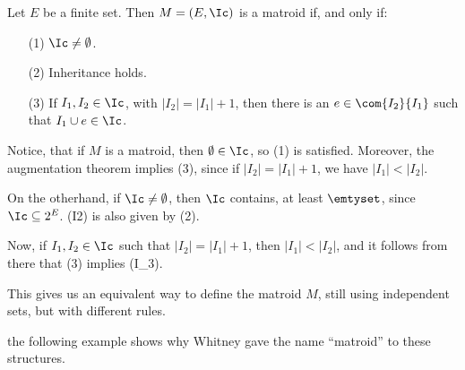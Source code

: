 \begin{example}
    Let $E$ be a finite set. Then $M=(E,\Ic)$ is a matroid if, and only if:
    \begin{enumerate}
        \item[(1)] $\Ic \neq \emptyset$.

        \item[(2)] Inheritance holds.

        \item[(3)] If $I_1,I_2 \in \Ic$, with $|I_2|=|I_1|+1$, then there is an
            $e \in \com{I_2}{I_1}$ such that $I_1 \cup e \in \Ic$.
    \end{enumerate}

    Notice, that if $M$ is a matroid, then  $\emptyset \in \Ic$, so  (1) is
    satisfied. Moreover, the augmentation theorem implies (3), since if
    $|I_2|=|I_1|+1$, we have $|I_1|<|I_2|$.

    On the otherhand, if $\Ic \neq \emptyset$, then $\Ic$ contains, at least
    $\emtyset$, since  $\Ic \subseteq 2^E$. (I2) is also given by (2).

    Now, if $I_1, I_2 \in \Ic$ such that $|I_2|=|I_1|+1$, then $|I_1|<|I_2|$,
    and it follows from there that (3) implies (I_3).

    This gives us an equivalent way to define the matroid $M$, still using
    independent sets, but with different rules.
\end{example}

the following example shows why Whitney gave the name ``matroid'' to these
structures.

